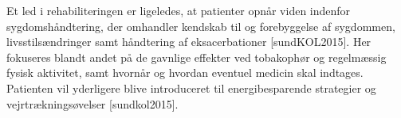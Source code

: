 Et led i rehabiliteringen er ligeledes, at patienter opnår viden indenfor sygdomshåndtering, der omhandler kendskab til og forebyggelse af sygdommen, livsstilsændringer samt håndtering af eksacerbationer\cite{McCarthy2015} [sundKOL2015]. Her fokuseres blandt andet på de gavnlige effekter ved tobakophør og regelmæssig fysisk aktivitet, samt hvornår og hvordan eventuel medicin skal indtages. Patienten vil yderligere blive introduceret til energibesparende strategier og vejrtrækningsøvelser \cite{McCarthy2015} [sundkol2015].   

